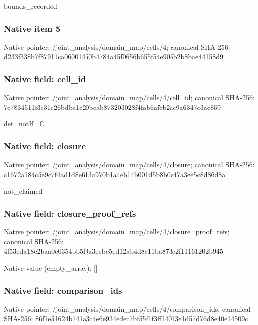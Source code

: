 \documentclass[10pt,a4paper]{article}
\begin{document}
\begingroup\raggedright\sloppy bounds\_\allowbreak{}recorded\par\endgroup

\subsubsection{Native item 5}
Native pointer: /joint\_\allowbreak{}analysis/domain\_\allowbreak{}map/cells/4; canonical SHA-256: d233f338b7f87911ca06001450b4784a45f0656b655f54e905b2b8bae44158d9

\subsubsection{Native field: cell\_\allowbreak{}id}
Native pointer: /joint\_\allowbreak{}analysis/domain\_\allowbreak{}map/cells/4/cell\_\allowbreak{}id; canonical SHA-256: 7c7834511f3c31c26bdbe1e20bcab873203028f4fab6afeb2ae9a6347c3ac859

\begingroup\raggedright\sloppy det\_\allowbreak{}notH\_\allowbreak{}C\par\endgroup

\subsubsection{Native field: closure}
Native pointer: /joint\_\allowbreak{}analysis/domain\_\allowbreak{}map/cells/4/closure; canonical SHA-256: c1672a184c5e9c7f4ad1d8e613a970b1a4eb14b001d5b8b0c47a3ee5c8d86d8a

\begingroup\raggedright\sloppy not\_\allowbreak{}claimed\par\endgroup

\subsubsection{Native field: closure\_\allowbreak{}proof\_\allowbreak{}refs}
Native pointer: /joint\_\allowbreak{}analysis/domain\_\allowbreak{}map/cells/4/closure\_\allowbreak{}proof\_\allowbreak{}refs; canonical SHA-256: 4f53cda18c2baa0c0354bb5f9a3ecbe5ed12ab4d8e11ba873c2f11161202b945

Native value (empty\_\allowbreak{}array): []

\subsubsection{Native field: comparison\_\allowbreak{}ids}
Native pointer: /joint\_\allowbreak{}analysis/domain\_\allowbreak{}map/cells/4/comparison\_\allowbreak{}ids; canonical SHA-256: 86f1e51624b741a3c4e6e934edec7bf55f1f3ff14013e1d57d76d8e40e14509c
\end{document}
